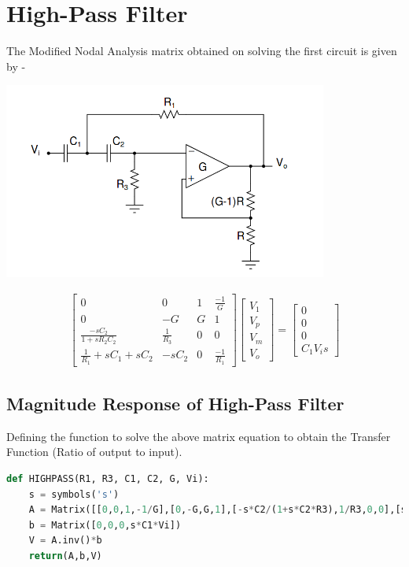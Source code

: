 \documentclass[a4paper]{article}
\begin{document}
\section{High-Pass Filter}
The Modified Nodal Analysis matrix obtained on solving the first circuit is given by -
\begin{center}
\includegraphics[width=0.8\textwidth]{Selection_002.png}
\end{center}
\begin{gather}
 \begin{bmatrix} 0 & 0 & 1 & \frac{-1}{G} \\  0 & -G & G & 1 \\ \frac{-sC_{2}}{1+sR_{2}C_{2}} & \frac{1}{R_{3}} & 0 & 0   \\\frac{1}{R_{1}}+sC_{1}+sC_{2} & -sC_{2} & 0 & \frac{-1}{R_{1}} \end{bmatrix}
 \begin{bmatrix}
 V_{1} \\ V_{p} \\V_{m}\\V_{o}
 \end{bmatrix}
 =
  \begin{bmatrix}
 0 \\ 0 \\ 0 \\ C_{1}V_{i}s
   \end{bmatrix}
\end{gather}
\subsection{Magnitude Response of High-Pass Filter}
Defining the function to solve the above matrix equation to obtain the Transfer Function  (Ratio of output to input).
\begin{lstlisting}[language=Python]
def HIGHPASS(R1, R3, C1, C2, G, Vi):
	s = symbols('s')
	A = Matrix([[0,0,1,-1/G],[0,-G,G,1],[-s*C2/(1+s*C2*R3),1/R3,0,0],[s*C1+s*C2+1/R1,-s*C2,0,-1/R1]])
	b = Matrix([0,0,0,s*C1*Vi])
	V = A.inv()*b
	return(A,b,V)
\end{lstlisting}
\end{document}
